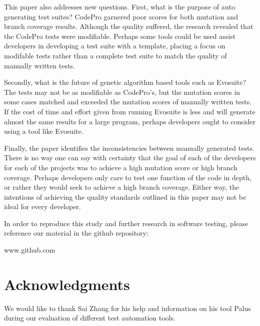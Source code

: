 \documentclass[conference]{IEEEtran}
\begin{document}
This paper also addresses new questions. First, what is the purpose of auto generating test suites? CodePro garnered poor scores for both mutation and branch coverage results. Although the quality suffered, the research revealed that the CodePro tests were modifiable. Perhaps some tools could be used assist developers in developing a test suite with a template, placing a focus on modifable tests rather than a complete test suite to match the quality of manually written tests.

Secondly, what is the future of genetic algorithm based tools such as Evosuite? The tests may not be as modifiable as CodePro's, but the mutation scores in some cases matched and exceeded the mutation scores of manually written tests. If the cost of time and effort given from running Evosuite is less and will generate almost the same results for a large program, perhaps developers ought to consider using a tool like Evosuite.

Finally, the paper identifies the inconsistencies between manually generated tests. There is no way one can say with certainty that the goal of each of the developers for each of the projects was to achieve a high mutation score or high branch coverage. Perhaps developers only care to test one function of the code in depth, or rather they would seek to achieve a high branch coverage. Either way, the intentions of achieving the quality standards outlined in this paper may not be ideal for every developer. 

In order to reproduce this study and further research in software testing, please reference our material in the github repository:

www.github.com

\section{Acknowledgments}
\label{sec:Acknowledgments}
We would like to thank Sai Zhang for his help and information on his tool Palus during our evaluation of different test automation tools.





\end{document}
